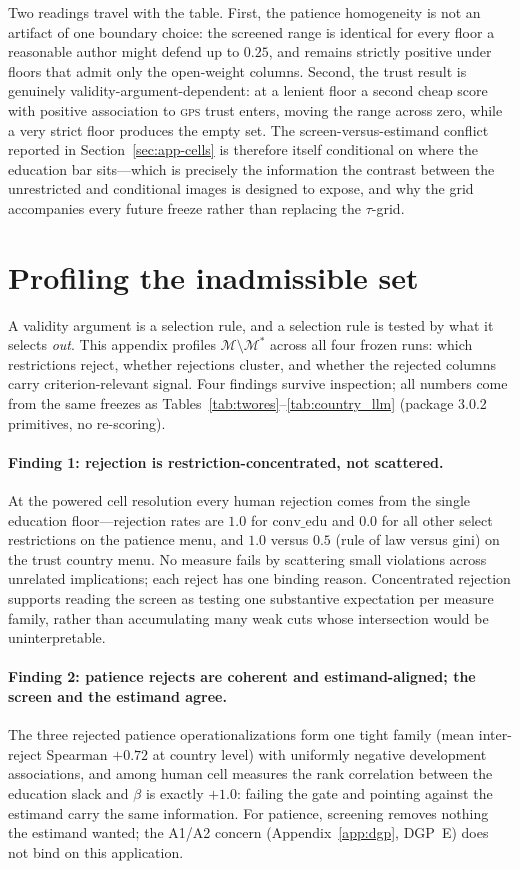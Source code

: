 \documentclass[10pt,letterpaper]{article}
\newcommand{\GPS}{\textsc{gps}}
\newcommand{\M}{\ensuremath{\mathcal{M}}}
\begin{document}
Two readings travel with the table.
First, the patience homogeneity is not an artifact of one boundary choice: the screened range is identical for every floor a reasonable author might defend up to $0.25$, and remains strictly positive under floors that admit only the open-weight columns.
Second, the trust result is genuinely validity-argument-dependent: at a lenient floor a second cheap score with positive association to \GPS{} trust enters, moving the range across zero, while a very strict floor produces the empty set.
The screen-versus-estimand conflict reported in Section~\ref{sec:app-cells} is therefore itself conditional on where the education bar sits---which is precisely the information the contrast between the unrestricted and conditional images is designed to expose, and why the grid accompanies every future freeze rather than replacing the $\tau$-grid.

\section{Profiling the inadmissible set}
\label{app:inadmissible}

A validity argument is a selection rule, and a selection rule is tested by what it selects \emph{out}.
This appendix profiles $\M\setminus\M^*$ across all four frozen runs: which restrictions reject, whether rejections cluster, and whether the rejected columns carry criterion-relevant signal.
Four findings survive inspection; all numbers come from the same freezes as Tables~\ref{tab:twores}--\ref{tab:country_llm} (package 3.0.2 primitives, no re-scoring).

\paragraph{Finding 1: rejection is restriction-concentrated, not scattered.}
At the powered cell resolution every human rejection comes from the single education floor---rejection rates are $1.0$ for $\mathrm{conv\_edu}$ and $0.0$ for all other select restrictions on the patience menu, and $1.0$ versus $0.5$ (rule of law versus gini) on the trust country menu.
No measure fails by scattering small violations across unrelated implications; each reject has one binding reason.
Concentrated rejection supports reading the screen as testing one substantive expectation per measure family, rather than accumulating many weak cuts whose intersection would be uninterpretable.

\paragraph{Finding 2: patience rejects are coherent and estimand-aligned; the screen and the estimand agree.}
The three rejected patience operationalizations form one tight family (mean inter-reject Spearman $+0.72$ at country level) with uniformly negative development associations, and among human cell measures the rank correlation between the education slack and $\beta$ is exactly $+1.0$: failing the gate and pointing against the estimand carry the same information.
For patience, screening removes nothing the estimand wanted; the A1/A2 concern (Appendix~\ref{app:dgp}, DGP~E) does not bind on this application.
\end{document}
